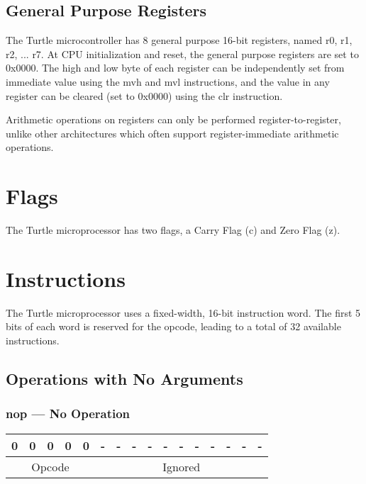 \documentclass[titlepage]{article}
\begin{document}
\subsection{General Purpose Registers}

The Turtle microcontroller has 8 general purpose 16-bit registers, named r0, r1, r2, ... r7. At CPU initialization and reset, the general purpose registers are set to 0x0000. The high and low byte of each register can be independently set from immediate value using the mvh and mvl instructions, and the value in any register can be cleared (set to 0x0000) using the clr instruction.

Arithmetic operations on registers can only be performed register-to-register, unlike other architectures which often support register-immediate arithmetic operations.

\section{Flags}

The Turtle microprocessor has two flags, a Carry Flag (c) and Zero Flag (z).

\section{Instructions}

The Turtle microprocessor uses a fixed-width, 16-bit instruction word. The first 5 bits of each word is reserved for the opcode, leading to a total of 32 available instructions.

\subsection{Operations with No Arguments}

\subsubsection{nop --- No Operation}
\begin{center}
\begin{tabular}{|c|c|c|c|c|c|c|c|c|c|c|c|c|c|c|c|}
\hline
0 & 0 & 0 & 0 & 0 & - & - & - & - & - & - & - & - & - & - & - \\
\hline
\multicolumn{5}{|c|}{Opcode} &
\multicolumn{11}{|c|}{Ignored} \\
\hline
\end{tabular}
\end{center}
\end{document}
